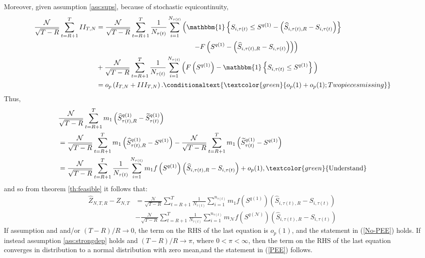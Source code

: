 Moreover, given assumption \ref{ass:sups}, because of stochastic equicontinuity, \conditionaltext{\textcolor{green}{Why assumption 5?}}
\begin{align*}
\frac{\mathcal{N}}{\sqrt{T-R}} \sum_{t=R+1}^{T} II_{T,N} &= \frac{\mathcal{N}}{\sqrt{T-R}} \sum_{t=R+1}^{T} \frac{1}{N_{\tau(t)}} \sum_{i=1}^{N_{\tau(t)}} \left( \mathbbm{1} \left\{ S_{i,\tau(t)}\leq S^{q(1)}-\left( \widehat{S}_{i,\tau(t),R}-S_{i,\tau(t) }\right) \right\} \right. \\
& \hspace{5cm} \left. -F\left( S^{q(1)}-\left( \widehat{S}_{i,\tau(t),R}-S_{i,\tau(t)}\right) \right) \right) \\
& + \frac{\mathcal{N}}{\sqrt{T-R}} \sum_{t=R+1}^{T} \frac{1}{N_{\tau(t)}} \sum_{i=1}^{N_{\tau(t)}} \Big( F\left( S^{q(1)}\right) - \mathbbm{1} \left\{ S_{i,\tau(t)}\leq S^{q(1)}\right\} \Big) \\
&= o_{p}\left( I_{T,N} + III_{T,N} \right). \conditionaltext{\textcolor{green}{o_p(1)+o_p(1); Two pieces missing}}
\end{align*}
Thus,
\begin{align*}
&\frac{\mathcal{N}}{\sqrt{T-R}}\sum_{t=R+1}^{T}m_{1}\left( \widehat{S}_{\tau(t),R}^{q(1)}-\widetilde{S}_{\tau(t)}^{q(1)}\right)  \\
&= \frac{\mathcal{N}}{\sqrt{T-R}}\sum_{t=R+1}^{T}m_{1}\left( \widehat{S}_{\tau(t),R}^{q(1)}-S^{q(1)}\right) -\frac{\mathcal{N}}{\sqrt{T-R}}\sum_{t=R+1}^{T}m_{1}\left( \widetilde{S}_{\tau(t)}^{q(1)}-S^{q(1)}\right) \\
&= \frac{\mathcal{N}}{\sqrt{T-R}}\sum_{t=R+1}^{T}\frac{1}{N_{\tau(t)}}\sum_{i=1}^{N_{\tau(t)}}m_{1} f\left(S^{q(1)}\right) \left( \widehat{S}_{i,\tau(t),R}-S_{i,\tau(t)}\right) +o_{p}(1), \textcolor{green}{\text{Understand}}
\end{align*}
and so from theorem \ref{th:feasible} it follows that:
\begin{align*}
\widehat{Z}_{N,T,R}-Z_{N,T} &= \frac{\mathcal{N}}{\sqrt{T-R}}\sum_{t=R+1}^{T} \frac{1}{N_{\tau(t)}}\sum_{i=1}^{n_{\tau(t)}} m_{1}f\left( S^{q(1)}\right) \left( \widehat{S}_{i,\tau(t),R}-S_{i,\tau(t)}\right) \\
& - \frac{\mathcal{N}}{\sqrt{T-R}}\sum_{t=R+1}^{T} \frac{1}{N_{\tau(t)}}\sum_{i=1}^{n_{\tau(t)}} m_{\mathcal{N}}f\left( S^{q(\mathcal{N})}\right) \left( \widehat{S}_{i,\tau(t),R}-S_{i,\tau(t)}\right) 
\end{align*}
If assumption  and \conditionaltext{\textcolor{green}{needed?}}and/or $(T-R)/R\rightarrow 0$, the term on the RHS of the last equation is $o_{p}(1)$, \conditionaltext{\textcolor{green}{Why?}}and the statement in (\ref{No-PEE}) holds. If instead assumption \ref{ass:strongdep} holds and $(T-R)/R\rightarrow \pi$, where $0 < \pi < \infty$, then the term on the RHS of the last equation converges in distribution to a normal distribution with zero mean,\conditionaltext{\textcolor{green}{Why?}}and the statement in (\ref{PEE}) follows. 
